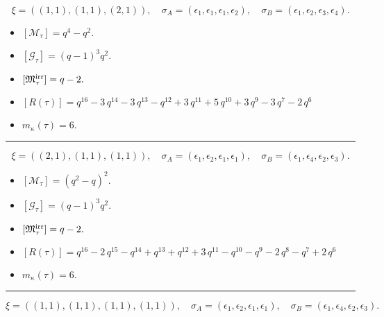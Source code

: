 \documentclass[10pt,a4paper]{amsart}
\begin{document}
$$\xi = ({(1, 1), (1, 1)}, {(2, 1)}),\quad \sigma_A = ({{\epsilon_1}, {\epsilon_1}}, {{\epsilon_1, \epsilon_2}}),\quad \sigma_B = ({{\epsilon_1}, {\epsilon_2}}, {{\epsilon_3, \epsilon_4}}).$$

\begin{itemize}
 \item $[\mathcal{M}_{\tau}] = q^{4} - q^{2} .$

 \item $[\mathcal{G}_{\tau}] = {\left(q - 1\right)}^{3} q^{2} .$

 \item $[{\frak M}_{\tau}^{\textrm{irr}}] = q - 2 .$

 \item $[R(\tau)] = q^{16} - 3 \, q^{14} - 3 \, q^{13} - q^{12} + 3 \, q^{11} + 5 \, q^{10} + 3 \, q^{9} - 3 \, q^{7} - 2 \, q^{6} $

 \item $m_{\kappa}(\tau) = 6 .$

 \end{itemize}
\noindent\rule{8cm}{0.4pt}

$$\xi = ({(2, 1)}, {(1, 1), (1, 1)}),\quad \sigma_A = ({{\epsilon_1, \epsilon_2}}, {{\epsilon_1}, {\epsilon_1}}),\quad \sigma_B = ({{\epsilon_1, \epsilon_4}}, {{\epsilon_2}, {\epsilon_3}}).$$

\begin{itemize}
 \item $[\mathcal{M}_{\tau}] = {\left(q^{2} - q\right)}^{2} .$

 \item $[\mathcal{G}_{\tau}] = {\left(q - 1\right)}^{3} q^{2} .$

 \item $[{\frak M}_{\tau}^{\textrm{irr}}] = q - 2 .$

 \item $[R(\tau)] = q^{16} - 2 \, q^{15} - q^{14} + q^{13} + q^{12} + 3 \, q^{11} - q^{10} - q^{9} - 2 \, q^{8} - q^{7} + 2 \, q^{6} $

 \item $m_{\kappa}(\tau) = 6 .$

 \end{itemize}
\noindent\rule{8cm}{0.4pt}

$$\xi = ({(1, 1), (1, 1)}, {(1, 1), (1, 1)}),\quad \sigma_A = ({{\epsilon_1}, {\epsilon_2}}, {{\epsilon_1}, {\epsilon_1}}),\quad \sigma_B = ({{\epsilon_1}, {\epsilon_4}}, {{\epsilon_2}, {\epsilon_3}}).$$
\end{document}
